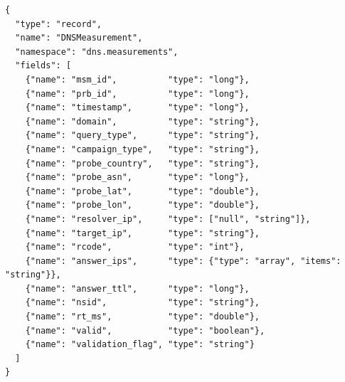 \documentclass[a4paper,11pt]{book}
\begin{document}
\begin{lstlisting}[caption=Avro schema for DNS results (main fields)]
{
  "type": "record",
  "name": "DNSMeasurement",
  "namespace": "dns.measurements",
  "fields": [
    {"name": "msm_id",          "type": "long"},
    {"name": "prb_id",          "type": "long"},
    {"name": "timestamp",       "type": "long"},
    {"name": "domain",          "type": "string"},
    {"name": "query_type",      "type": "string"},
    {"name": "campaign_type",   "type": "string"},
    {"name": "probe_country",   "type": "string"},
    {"name": "probe_asn",       "type": "long"},
    {"name": "probe_lat",       "type": "double"},
    {"name": "probe_lon",       "type": "double"},
    {"name": "resolver_ip",     "type": ["null", "string"]},
    {"name": "target_ip",       "type": "string"},
    {"name": "rcode",           "type": "int"},
    {"name": "answer_ips",      "type": {"type": "array", "items": "string"}},
    {"name": "answer_ttl",      "type": "long"},
    {"name": "nsid",            "type": "string"},
    {"name": "rt_ms",           "type": "double"},
    {"name": "valid",           "type": "boolean"},
    {"name": "validation_flag", "type": "string"}
  ]
}
\end{lstlisting}
\end{document}
